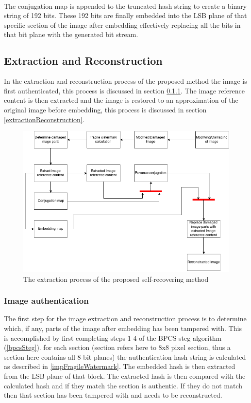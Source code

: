 \documentclass[12pt]{article}
\begin{document}
\hspace{0pt} \\
The conjugation map is appended to the truncated hash string to create a binary string of 192 bits.
These 192 bits are finally embedded into the LSB plane of that specific section of the image after embedding effectively replacing all the bits in that bit plane with the generated bit stream.

\subsection{Extraction and Reconstruction}
\label{extractRestore}
In the extraction and reconstruction process of the proposed method the image is first authenticated, this process is discussed in section \ref{extractionAuthentication}. 
The image reference content is then extracted and the image is restored to an approximation of the original image before embedding, this process is discussed in section \ref{extractionReconstruction}.

\begin{figure}[h]
\centerline{%
\includegraphics[scale=0.6]{"ExtractionProcess"}%
} %
\caption{The extraction process of the proposed self-recovering method}
\label{fig:extractionProcess}
\end{figure} 

\subsubsection{Image authentication}
\label{extractionAuthentication}
The first step for the image extraction and reconstruction process is to determine which, if any, parts of the image after embedding has been tampered with.
This is accomplished by first completing steps 1-4 of the BPCS steg algorithm (\ref{bpcsSteg}).
for each section (section refers here to 8x8 pixel section, thus a section here contains all 8 bit planes) the authentication hash string is calculated as described in \ref{impFragileWatermark}. 
The embedded hash is then extracted from the LSB plane of that block.
The extracted hash is then compared with the calculated hash and if they match the section is authentic.
If they do not match then that section has been tampered with and needs to be reconstructed.
\end{document}

